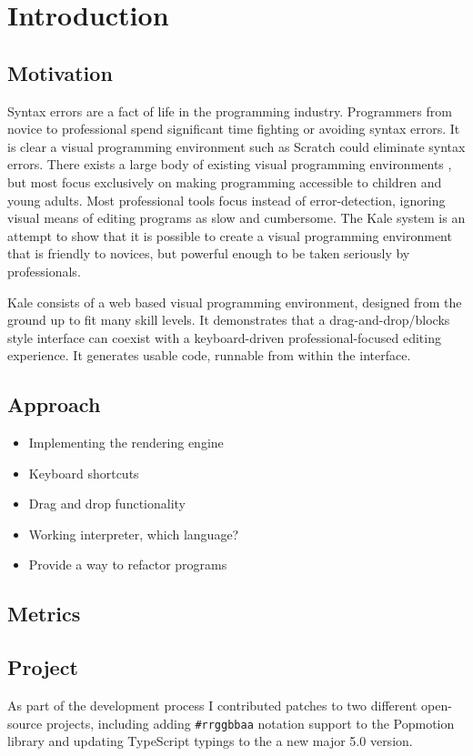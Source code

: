 \chapter{Introduction}

\section{Motivation}
Syntax errors are a fact of life in the programming industry. Programmers from
novice \citep{Denny2011} to professional spend significant time fighting or
avoiding syntax errors. It is clear a visual programming environment such
as Scratch could eliminate syntax errors. There exists a large body of existing
visual programming environments \citep{Beldie1983}, but most focus exclusively
on making programming accessible to children and young adults. Most
professional tools focus instead of error-detection, ignoring visual means of
editing programs as slow and cumbersome. The Kale system is an attempt to show that it is possible to create a
visual programming environment that is friendly to novices, but powerful enough to be
taken seriously by professionals. 

Kale consists of a web based visual programming environment, designed
from the ground up to fit many skill levels. It demonstrates that a
drag-and-drop/blocks style interface can coexist with a keyboard-driven
professional-focused editing experience. It generates usable code,
runnable from within the interface.

\section{Approach}

\begin{itemize}
	\item Implementing the rendering engine
	\item Keyboard shortcuts
	\item Drag and drop functionality
	\item Working interpreter, which language?
	\item Provide a way to refactor programs
\end{itemize}

\section{Metrics}
\section{Project}

As part of the development process I contributed patches to two different
open-source projects, including adding \texttt{\#rrggbbaa} notation support
to the Popmotion library \cite{github-pr-popmotion} and updating
 TypeScript typings to the a new major 5.0
version\cite{github-pr-styled-components}.
